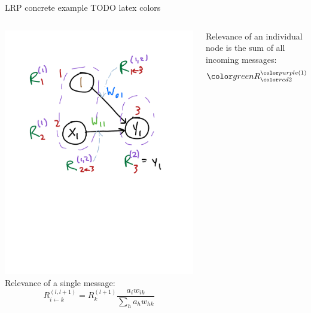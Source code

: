 \documentclass[xetex,compress]{beamer}
\makeatletter
\def\mathcolor#1#{\@mathcolor{#1}}
\def\@mathcolor#1#2#3{%
  \protect\leavevmode
  \begingroup
    \color#1{#2}#3%
  \endgroup
}
\makeatother
\begin{document}

\begin{frame}{LRP concrete example}
  TODO latex colors
  \begin{columns}
    \begin{column}{0.5\textwidth}
      \includegraphics[width=1.0\textwidth]{./figures/lr_nn_6.pdf} \\
      Relevance of a single message:
      \begin{equation*}
        R_{i \leftarrow k}^{(l,l+1)} = R_{k}^{(l+1)} \frac{a_{i} w_{ik}}{\sum_{h} a_{h} w_{hk}}
      \end{equation*}
    \end{column}
    \begin{column}{0.5\textwidth}
      Relevance of an individual node is the sum of all incoming messages:
      \begin{equation*}
        \mathcolor{green}{R}_{\mathcolor{red}{2}}^{\mathcolor{purple}{(1)}} = \mathcolor{green}{R}_{\mathcolor{red}{2\leftarrow 3}}^{\mathcolor{purple}{(1,2)}}

\end{equation*}
\end{column}
\end{columns}
\end{frame}
\end{document}
